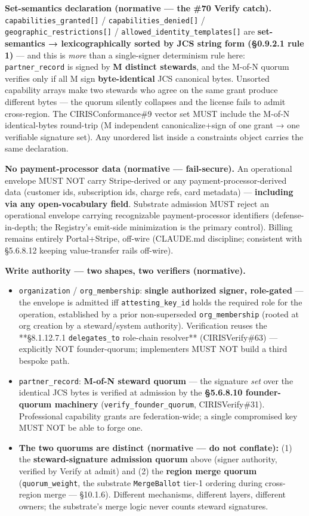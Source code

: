\documentclass[11pt]{article}
\begin{document}
\textbf{Set-semantics declaration (normative — the \#70 Verify catch).} \texttt{capabilities\_granted[]} / \texttt{capabilities\_denied[]} / \texttt{geographic\_restrictions[]} / \texttt{allowed\_identity\_templates[]} are \textbf{set-semantics → lexicographically sorted by JCS string form (§0.9.2.1 rule 1)} — and this is \textit{more} than a single-signer determinism rule here: \texttt{partner\_record} is signed by \textbf{M distinct stewards}, and the M-of-N quorum verifies only if all M sign \textbf{byte-identical} JCS canonical bytes. Unsorted capability arrays make two stewards who agree on the same grant produce different bytes — the quorum silently collapses and the license fails to admit cross-region. The CIRISConformance\#9 vector set MUST include the M-of-N identical-bytes round-trip (M independent canonicalize+sign of one grant → one verifiable signature set). Any unordered list inside a constraints object carries the same declaration.


\textbf{No payment-processor data (normative — fail-secure).} An operational envelope MUST NOT carry Stripe-derived or any payment-processor-derived data (customer ids, subscription ids, charge refs, card metadata) — \textbf{including via any open-vocabulary field}. Substrate admission MUST reject an operational envelope carrying recognizable payment-processor identifiers (defense-in-depth; the Registry's emit-side minimization is the primary control). Billing remains entirely Portal+Stripe, off-wire (CLAUDE.md discipline; consistent with §5.6.8.12 keeping value-transfer rails off-wire).


\textbf{Write authority — two shapes, two verifiers (normative).}

\begin{itemize}\setlength\itemsep{0pt}
\item \texttt{organization} / \texttt{org\_membership}: \textbf{single authorized signer, role-gated} — the envelope is admitted iff \texttt{attesting\_key\_id} holds the required role for the operation, established by a prior non-superseded \texttt{org\_membership} (rooted at org creation by a steward/system authority). Verification reuses the **§8.1.12.7.1 \texttt{delegates\_to} role-chain resolver** (CIRISVerify\#63) — explicitly NOT founder-quorum; implementers MUST NOT build a third bespoke path.
\item \texttt{partner\_record}: \textbf{M-of-N steward quorum} — the signature \textit{set} over the identical JCS bytes is verified at admission by the \textbf{§5.6.8.10 founder-quorum machinery} (\texttt{verify\_founder\_quorum}, CIRISVerify\#31). Professional capability grants are federation-wide; a single compromised key MUST NOT be able to forge one.
\item \textbf{The two quorums are distinct (normative — do not conflate):} (1) the \textbf{steward-signature admission quorum} above (signer authority, verified by Verify at admit) and (2) the \textbf{region merge quorum} (\texttt{quorum\_weight}, the substrate \texttt{MergeBallot} tier-1 ordering during cross-region merge — §10.1.6). Different mechanisms, different layers, different owners; the substrate's merge logic never counts steward signatures.
\end{itemize}
\end{document}
